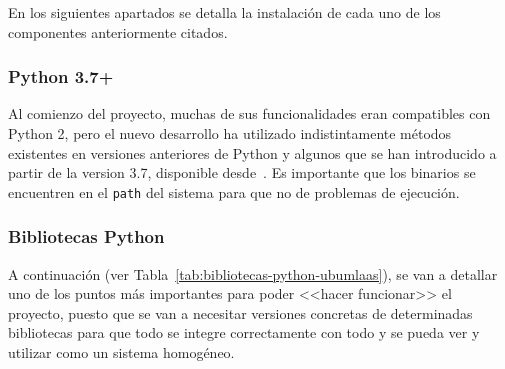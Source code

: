 En los siguientes apartados se detalla la instalación de cada uno de los componentes anteriormente citados.

\subsubsection{Python 3.7+}
Al comienzo del proyecto, muchas de sus funcionalidades eran compatibles con Python 2, pero el nuevo desarrollo ha utilizado indistintamente métodos existentes en versiones anteriores de Python y algunos que se han introducido a partir de la version 3.7, disponible desde~\cite{pythonGetIt}. Es importante que los binarios se encuentren en el \texttt{path} del sistema para que no de problemas de ejecución.

\subsubsection{Bibliotecas Python}
A continuación (ver Tabla~\ref{tab:bibliotecas-python-ubumlaas}), se van a detallar uno de los puntos más importantes para poder <<hacer funcionar>> el proyecto, puesto que se van a necesitar versiones concretas de determinadas bibliotecas para que todo se integre correctamente con todo y se pueda ver y utilizar como un sistema homogéneo.

